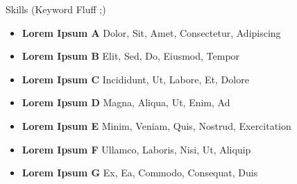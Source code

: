 \documentclass[]{mcdowellcv}
\begin{document}
\begin{cvsection}{Skills (Keyword Fluff ;)}
    \begin{cvsubsection}{}{}{}
        \begin{itemize}
            \item \textbf{Lorem Ipsum A}  Dolor, Sit, Amet, Consectetur, Adipiscing
            \item \textbf{Lorem Ipsum B}  Elit, Sed, Do, Eiusmod, Tempor
            \item \textbf{Lorem Ipsum C}  Incididunt, Ut, Labore, Et, Dolore
            \item \textbf{Lorem Ipsum D}  Magna, Aliqua, Ut, Enim, Ad
            \item \textbf{Lorem Ipsum E}  Minim, Veniam, Quis, Nostrud, Exercitation
            \item \textbf{Lorem Ipsum F}  Ullamco, Laboris, Nisi, Ut, Aliquip
            \item \textbf{Lorem Ipsum G}  Ex, Ea, Commodo, Consequat, Duis
        \end{itemize}
    \end{cvsubsection}
\end{cvsection}
\customfooter
\end{document}
